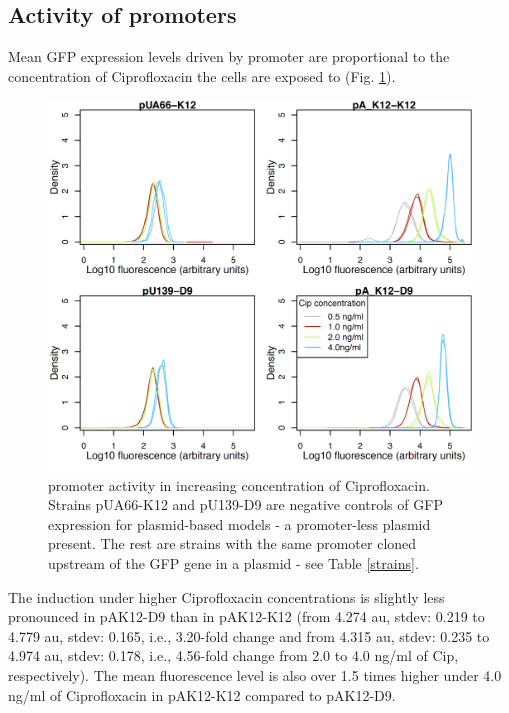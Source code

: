 \subsection{Activity of  promoters}
Mean GFP expression levels driven by  promoter are proportional to the concentration of Ciprofloxacin the cells are exposed to (Fig. \ref{recAassay}).
\begin{figure}[ht!]
  \centering
  \includegraphics[scale=0.25]{text/Pictures/recAassay.png}
    \caption{ promoter activity in increasing concentration of Ciprofloxacin. Strains pUA66-K12 and pU139-D9 are negative controls of GFP expression for plasmid-based models - a promoter-less plasmid present. The rest are strains with the same  promoter cloned upstream of the GFP gene in a plasmid - see Table \ref{strains}.}
    \label{recAassay}
\end{figure}
The induction under higher Ciprofloxacin concentrations is slightly less pronounced in pA\textunderscore K12-D9 than in pA\textunderscore K12-K12 (from 4.274 au, stdev: 0.219 to 4.779 au, stdev: 0.165, i.e., 3.20-fold change and from 4.315 au, stdev: 0.235 to 4.974 au, stdev: 0.178, i.e., 4.56-fold change from 2.0 to 4.0 ng/ml of Cip, respectively).
The mean fluorescence level is also over 1.5 times higher under 4.0 ng/ml of Ciprofloxacin in pA\textunderscore K12-K12 compared to pA\textunderscore K12-D9.

